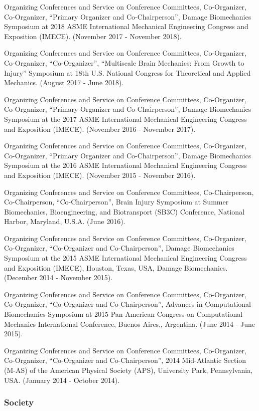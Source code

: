 \documentclass[11pt]{article}
\begin{document}
Organizing Conferences and Service on Conference Committees,
Co-Organizer, Co-Organizer, ``Primary Organizer and Co-Chairperson'',
Damage Biomechanics Symposium at 2018 ASME International Mechanical
Engineering Congress and Exposition (IMECE). 
(November 2017 - November
2018).

Organizing Conferences and Service on Conference Committees,
Co-Organizer, Co-Organizer, ``Co-Organizer'', ``Multiscale Brain Mechanics:
From Growth to Injury'' Symposium at 18th U.S. 
National Congress for
Theoretical and Applied Mechanics. 
(August 2017 - June 2018).

Organizing Conferences and Service on Conference Committees,
Co-Organizer, Co-Organizer, ``Primary Organizer and Co-Chairperson'',
Damage Biomechanics Symposium at the 2017 ASME International Mechanical
Engineering Congress and Exposition (IMECE). 
(November 2016 - November
2017).

Organizing Conferences and Service on Conference Committees,
Co-Organizer, Co-Organizer, ``Primary Organizer and Co-Chairperson'',
Damage Biomechanics Symposium at the 2016 ASME International Mechanical
Engineering Congress and Exposition (IMECE). 
(November 2015 - November
2016).

Organizing Conferences and Service on Conference Committees,
Co-Chairperson, Co-Chairperson, ``Co-Chairperson'', Brain Injury Symposium
at Summer Biomechanics, Bioengineering, and Biotransport (SB3C)
Conference, National Harbor, Maryland, U.S.A. 
(June 2016).

Organizing Conferences and Service on Conference Committees,
Co-Organizer, Co-Organizer, ``Co-Organizer and Co-Chairperson'', Damage
Biomechanics Symposium at the 2015 ASME International Mechanical
Engineering Congress and Exposition (IMECE), Houston, Texas, USA, Damage
Biomechanics. 
(December 2014 - November 2015).

Organizing Conferences and Service on Conference Committees,
Co-Organizer, Co-Organizer, ``Co-Organizer and Co-Chairperson'', Advances
in Computational Biomechanics Symposium at 2015 Pan-American Congress on
Computational Mechanics International Conference, Buenos Aires,,
Argentina. 
(June 2014 - June 2015).

Organizing Conferences and Service on Conference Committees,
Co-Organizer, Co-Organizer, ``Co-Organizer and Co-Chairperson'', 2014
Mid-Atlantic Section (M-AS) of the American Physical Society (APS),
University Park, Pennsylvania, USA. 
(January 2014 - October 2014).

\subsubsection{Society}\label{society}
\end{document}
